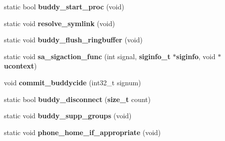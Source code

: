 \begin{DoxyCompactItemize}
\item 
static bool {\bf buddy\_\-start\_\-proc} (void)
\item 
static void {\bf resolve\_\-symlink} (void)
\item 
static void {\bf buddy\_\-flush\_\-ringbuffer} (void)
\item 
static void {\bf sa\_\-sigaction\_\-func} (int signal, {\bf siginfo\_\-t} $\ast${\bf siginfo}, void $\ast${\bf ucontext})
\item 
void {\bf commit\_\-buddycide} (int32\_\-t signum)
\item 
static bool {\bf buddy\_\-disconnect} ({\bf size\_\-t} count)
\item 
static void {\bf buddy\_\-supp\_\-groups} (void)
\item 
static void {\bf phone\_\-home\_\-if\_\-appropriate} (void)
\end{DoxyCompactItemize}

